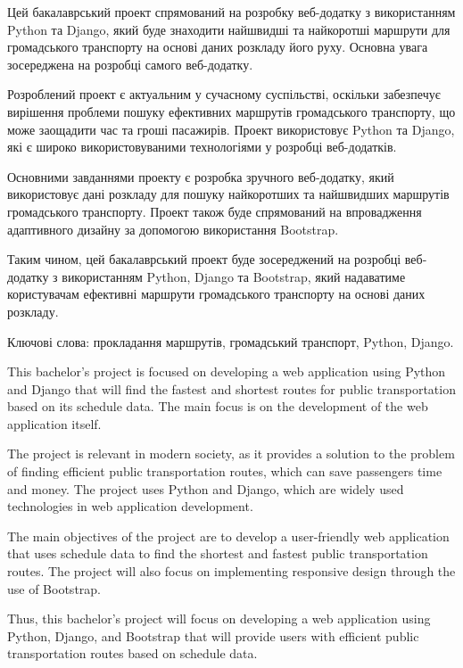 \abstractUkr


Цей бакалаврський проект спрямований на розробку веб-додатку з використанням Python та Django, який буде знаходити найшвидші та найкоротші маршрути для громадського транспорту на основі даних розкладу його  руху. Основна увага зосереджена на розробці самого веб-додатку.

Розроблений проект є актуальним у сучасному суспільстві, оскільки забезпечує вирішення проблеми пошуку ефективних маршрутів громадського транспорту, що може заощадити час та гроші пасажирів. Проект використовує Python та Django, які є широко використовуваними технологіями у розробці веб-додатків.

Основними завданнями проекту є розробка зручного веб-додатку, який використовує дані розкладу для пошуку найкоротших та найшвидших маршрутів громадського транспорту. Проект також буде спрямований на впровадження адаптивного дизайну за допомогою використання Bootstrap.

Таким чином, цей бакалаврський проект буде зосереджений на розробці веб-додатку з використанням Python, Django та Bootstrap, який надаватиме користувачам ефективні маршрути громадського транспорту на основі даних розкладу.

Ключові слова: прокладання маршрутів, громадський транспорт, Python, Django.


\abstractEng


This bachelor's project is focused on developing a web application using Python and Django that will find the fastest and shortest routes for public transportation based on its schedule data. The main focus is on the development of the web application itself.

The project is relevant in modern society, as it provides a solution to the problem of finding efficient public transportation routes, which can save passengers time and money. The project uses Python and Django, which are widely used technologies in web application development.

The main objectives of the project are to develop a user-friendly web application that uses schedule data to find the shortest and fastest public transportation routes. The project will also focus on implementing responsive design through the use of Bootstrap.

Thus, this bachelor's project will focus on developing a web application using Python, Django, and Bootstrap that will provide users with efficient public transportation routes based on schedule data.